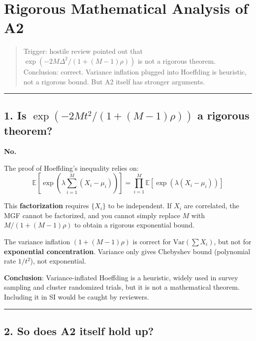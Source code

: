 \documentclass[
  12pt,
]{article}
\author{SCX}
\date{2026}
\begin{document}
\section{Rigorous Mathematical Analysis of A2}\label{rigorous-mathematical-analysis-of-a2}

\begin{quote}
Trigger: hostile review pointed out that \(\exp(-2M\Delta^2/(1+(M-1)\rho))\) is not a rigorous theorem. Conclusion: correct. Variance inflation plugged into Hoeffding is heuristic, not a rigorous bound. But A2 itself has stronger arguments.
\end{quote}

\begin{center}\rule{0.5\linewidth}{0.5pt}\end{center}

\subsection{1. Is \(\exp(-2M t^2/(1+(M-1)\rho))\) a rigorous theorem?}\label{is-exp-a-rigorous-theorem}

\textbf{No.}

The proof of Hoeffding's inequality relies on:
\[\mathbb{E}\left[\exp\left(\lambda\sum_{i=1}^M (X_i - \mu_i)\right)\right] = \prod_{i=1}^M \mathbb{E}[\exp(\lambda(X_i - \mu_i))]\]

This \textbf{factorization} requires \(\{X_i\}\) to be independent. If \(X_i\) are correlated, the MGF cannot be factorized, and you cannot simply replace \(M\) with \(M/(1+(M-1)\rho)\) to obtain a rigorous exponential bound.

The variance inflation \((1+(M-1)\rho)\) is correct for \(\text{Var}(\sum X_i)\), but not for \textbf{exponential concentration}. Variance only gives Chebyshev bound (polynomial rate \(1/t^2\)), not exponential.

\textbf{Conclusion}: Variance-inflated Hoeffding is a heuristic, widely used in survey sampling and cluster randomized trials, but it is not a mathematical theorem. Including it in SI would be caught by reviewers.

\begin{center}\rule{0.5\linewidth}{0.5pt}\end{center}

\subsection{2. So does A2 itself hold up?}\label{so-does-a2-itself-hold-up}
\end{document}
